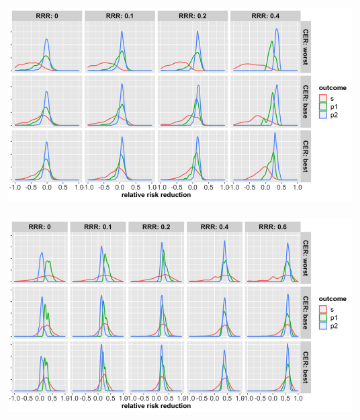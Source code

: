 \documentclass[]{article}
\begin{document}
\begin{figure}
\centering
  \caption{Distribution of relative risk reduction estimates after stopping early for (a) futility; (b) superiority.
  Results are presented for the three control event rates by rows, four relative risk reductions (by columns) and the
  three outcomes (legend).}
  \begin{subfigure}{0.8\textwidth}
    \centering
    \caption{}
    \includegraphics{../p1_plots/batch_size_nb_3000/RRRhat_fut_p1.png}
  \end{subfigure}
  \bigbreak
  \begin{subfigure}{0.8\textwidth}
    \centering
    \caption{}
    \includegraphics{../p1_plots/batch_size_nb_3000/RRRhat_sup_p1.png}
  \end{subfigure}
\end{figure}
\end{document}
